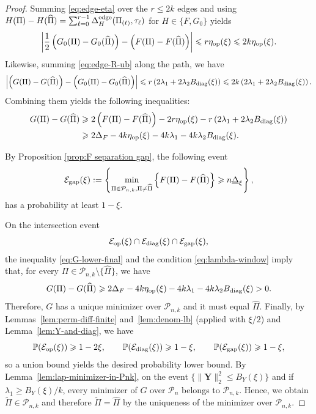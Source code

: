 \documentclass[11pt, reqno]{amsart}
\newcommand{\bP}{\mathbb{P}}
\renewcommand{\tilde}{\widetilde}
\renewcommand{\hat}{\widehat}
\renewcommand{\le}{\leqslant}
\renewcommand{\ge}{\geqslant}
\newcommand{\mP}{\mathcal{P}}
\newcommand{\1}{\mbox{1}\hspace{-0.25em}\mbox{l}}
\theoremstyle{definition}\newtheorem{problem}{Problem}[section]
\theoremstyle{definition}\newtheorem{definition}[problem]{Definition}
\theoremstyle{remark}\newtheorem{assumption}{Assumption}
\theoremstyle{remark}\newtheorem{remark}[problem]{Remark}
\theoremstyle{definition}\newtheorem{example}[problem]{Example}
\theoremstyle{plain}\newtheorem{theorem}[problem]{Theorem}
\theoremstyle{plain}\newtheorem{question}[problem]{Question}
\theoremstyle{plain}\newtheorem{lemma}[problem]{Lemma}
\theoremstyle{plain}\newtheorem{proposition}[problem]{Proposition}
\theoremstyle{plain}\newtheorem{corollary}[problem]{Corollary}
\theoremstyle{plain}\newtheorem{conjecture}[problem]{Conjecture}
\begin{document}
\begin{proof}
Summing \eqref{eq:edge-eta} over the $r\le 2k$ edges and using
$
H(\Pi)-H(\hat \Pi)=\sum_{\ell=0}^{r-1}\Delta_H^{\rm edge}(\Pi_{(\ell)},\tau_\ell)
$
for $H\in\{F,G_0\}$ yields
\begin{equation}\label{eq:G0-vs-F}
\left|
\frac{1}{2}\left(G_0(\Pi)-G_0(\hat\Pi)\right)-\left(F(\Pi)-F(\hat\Pi)\right)
\right|
 \le r \eta_{\rm op}(\xi) \le 2k \eta_{\rm op}(\xi).
\end{equation}
Likewise, summing \eqref{eq:edge-R-ub} along the path, we have
\begin{equation}\label{eq:G-vs-G0}
\left|\left(G(\Pi)-G(\hat\Pi)\right)-\left(G_0(\Pi)-G_0(\hat\Pi)\right)\right|
 \le r\left(2\lambda_1+2\lambda_2 B_{\rm diag}(\xi)\right) \le 2k\left(2\lambda_1+2\lambda_2 B_{\rm diag}(\xi)\right).
\end{equation}
Combining them yields the following inequalities:
\begin{align}
G(\Pi)-G(\hat\Pi)
& \ge 2\left(F(\Pi)-F(\hat\Pi)\right) - 2r \eta_{\rm op}(\xi) - r \left(2\lambda_1+2\lambda_2 B_{\rm diag}(\xi)\right)\nonumber\\
& \ge 2\Delta_F - 4k \eta_{\rm op}(\xi) - 4k\lambda_1 - 4k\lambda_2 B_{\rm diag}(\xi).
\label{eq:G-lower-final}
\end{align}

By Proposition \ref{prop:F separation gap}, the following event
\[
\mathcal{E}_{\rm gap}(\xi) := \left\{\min_{\Pi\in\mP_{n,k}, \Pi \neq \hat\Pi}\left\{F(\Pi)-F(\hat {\Pi}) \right\} \ge n\underline\Delta_\xi \right\},
\] 
has a probability at least $1 - \xi$.

On the intersection event
\[
\mathcal{E}_{\rm op}(\xi)\cap\mathcal{E}_{\rm diag}(\xi)\cap\mathcal{E}_{\rm gap}(\xi),
\]
the inequality \eqref{eq:G-lower-final} and the condition \eqref{eq:lambda-window} imply that, for every $\Pi\in\mP_{n,k}\setminus\{\hat\Pi\}$, we have
\[
G(\Pi)-G(\hat\Pi) \ge 2\Delta_F - 4k \eta_{\rm op}(\xi) - 4k\lambda_1 - 4k\lambda_2 B_{\rm diag}(\xi)
 > 0.
\]
Therefore, $G$ has a unique minimizer over $\mP_{n,k}$ and it must equal $\hat\Pi$.
Finally, by Lemmas~\ref{lem:perm-diff-finite} and~\ref{lem:denom-lb} (applied with $\xi/2$) and Lemma~\ref{lem:Y-and-diag}, we have
\[
\bP(\mathcal{E}_{\rm op}(\xi))\ge 1-2\xi,\qquad
\bP(\mathcal{E}_{\rm diag}(\xi))\ge 1-\xi,\qquad
\bP(\mathcal{E}_{\rm gap}(\xi))\ge 1-\xi,
\]
so a union bound yields the desired probability lower bound. By Lemma~\ref{lem:lap-minimizer-in-Pnk}, on the event $\{\|\bm Y\|_2^2\le B_Y(\xi)\}$ and if $\lambda_1\ge B_Y(\xi)/k$,
every minimizer of $G$ over $\mP_n$ belongs to $\mP_{n,k}$.
Hence, we obtain $\tilde\Pi\in\mP_{n,k}$ and therefore $\tilde\Pi=\hat\Pi$ by the uniqueness of the minimizer over $\mP_{n,k}$.
\end{proof}
\end{document}
